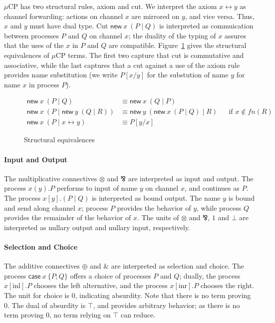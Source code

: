 \documentclass[orivec,envcountsame]{llncs}
\newcommand{\with}{\mathbin\binampersand}
\newcommand{\parr}{\mathbin\bindnasrepma}
\newcommand{\cpdual}[1]{#1^\perp}
\newcommand{\mkwd}[1]{\mathsf{#1}}
\newcommand{\link}[2]{#1 \leftrightarrow #2}
\newcommand{\cut}[4]{\mkwd{new}\:#1 \: (#3 \mid #4)}
\newcommand{\clabel}[1]{\mathrm{#1}}
\renewcommand{\case}[2]{\mkwd{case}\:#1\:\{#2\}}
\newcommand{\sel}[2]{#1[\clabel{#2}]}
\newcommand{\mucp}{$\mu\mathrm{CP}$\xspace}
\begin{document}
\mucp has two structural rules, axiom and cut.  We interpret the axiom $\link{x}{y}$ as channel
forwarding: actions on channel $x$ are mirrored on $y$, and vice versa.  Thus, $x$ and $y$ must have
dual type.  Cut $\cut{x}{A}{P}{Q}$ is interpreted as commuication between processes $P$ and $Q$ on
channel $x$; the duality of the typing of $x$ assures that the uses of the $x$ in $P$ and $Q$ are
compatible.  Figure~\ref{fig:equivalences} gives the structural equivalences of \mucp terms.  The
first two capture that cut is commutative and associative, while the last captures that a cut
against a use of the axiom rule provides name substitution (we write $P[x/y]$ for the substution of
name $y$ for name $x$ in process $P$).

\begin{figure}
\begin{align*}
  \cut{x}{A}{P}{Q} &\equiv \cut{x}{\cpdual{A}}{Q}{P} \\
  \cut{x}{A}{P}{\cut{y}{B}{Q}{R}} &\equiv \cut{y}{B}{\cut{x}{A}{P}{Q}}{R} &&\text{if $x \not\in fn(R)$} \\
  \cut{x}{A}{P}{\link{x}{y}} &\equiv P[y/x]
\end{align*}
\caption{Structural equivalences}\label{fig:equivalences}
\end{figure}

\paragraph{Input and Output}

The multiplicative connectives $\otimes$ and $\parr$ are interpreted as input and output.  The
process $x(y).P$ performs to input of name $y$ on channel $x$, and continues as $P$. The process
$x[y].(P \mid Q)$ is interpreted as bound output.  The name $y$ is bound and send along channel $x$;
process $P$ provides the behavior of $y$, while process $Q$ provides the remainder of the behavior
of $x$.  The units of $\otimes$ and $\parr$, $1$ and $\bot$ are interpreted as nullary output and
nullary input, respectively.

\paragraph{Selection and Choice}

The additive connectives $\oplus$ and $\with$ are interpreted as selection and choice.  The process
$\case{x}{P;Q}$ offers a choice of processes $P$ and $Q$; dually, the process $\sel{x}{inl}.P$
chooses the left alternative, and the process $\sel{x}{inr}.P$ chooses the right.  The unit for
choice is $0$, indicating absurdity.  Note that there is no term proving $0$.  The dual of absurdity
is $\top$, and provides arbitrary behavior; as there is no term proving $0$, no term relying on
$\top$ can reduce.
\end{document}
